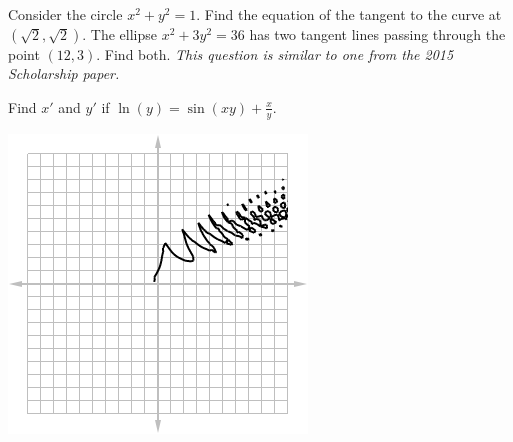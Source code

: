 \begin{questions}
\begin{multicols}{2}
    \end{multicols}
  \questioM Consider the circle $ x^2 + y^2 = 1 $. Find the equation of the tangent to the curve at $ (\sqrt{2}, \sqrt{2}) $.
  \questioS The ellipse $ x^2 + 3y^2 = 36 $ has two tangent lines passing through the point $ (12, 3) $. Find both.
    \textit{This question is similar to one from the 2015 Scholarship paper.}
  \begin{multicols}{2}
  \questioM Find $ x' $ and $ y' $ if $ \ln(y) = \sin(xy) + \frac{x}{y} $.
            \begin{center}
              \includegraphics[width=0.6\linewidth]{implicit13}

\end{center}
\end{multicols}
\end{questions}

